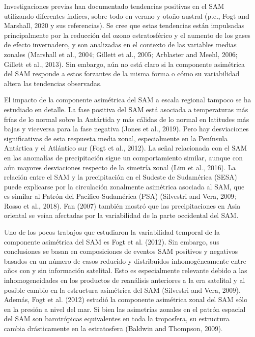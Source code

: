 \documentclass[12pt,oneside]{reedthesis}
\begin{document}
Investigaciones previas han documentado tendencias positivas en el SAM utilizando diferentes índices, sobre todo en verano y otoño austral (p.e., Fogt and Marshall, 2020 y sus referencias).
Se cree que estas tendencias están impulsadas principalmente por la reducción del ozono estratosférico y el aumento de los gases de efecto invernadero, y son analizadas en el contexto de las variables medias zonales (Marshall et al., 2004; Gillett et al., 2005; Arblaster and Meehl, 2006; Gillett et al., 2013).
Sin embargo, aún no está claro si la componente asimétrica del SAM responde a estos forzantes de la misma forma o cómo su variabilidad altera las tendencias observadas.

El impacto de la componente asimétrica del SAM a escala regional tampoco se ha estudiado en detalle.
La fase positiva del SAM está asociada a temperaturas más frías de lo normal sobre la Antártida y más cálidas de lo normal en latitudes más bajas y viceversa para la fase negativa (Jones et al., 2019).
Pero hay desviaciones significativas de esta respuesta media zonal, especialmente en la Península Antártica y el Atlántico sur (Fogt et al., 2012).
La señal relacionada con el SAM en las anomalías de precipitación sigue un comportamiento similar, aunque con aún mayores desviaciones respecto de la simetría zonal (Lim et al., 2016).
La relación entre el SAM y la precipitación en el Sudeste de Sudamérica (SESA) puede explicarse por la circulación zonalmente asimétrica asociada al SAM, que es similar al Patrón del Pacífico-Sudamérica (PSA) (Silvestri and Vera, 2009; Rosso et al., 2018).
Fan (2007) también mostró que las precipitaciones en Asia oriental se veían afectadas por la variabilidad de la parte occidental del SAM.

Uno de los pocos trabajos que estudiaron la variabilidad temporal de la componente asimétrica del SAM es Fogt et al. (2012).
Sin embargo, sus conclusiones se basan en composiciones de eventos SAM positivos y negativos basados en un número de casos reducido y distribuidos inhomogéneamente entre años con y sin información satelital.
Esto es especialmente relevante debido a las inhomogeneidades en los productos de reanálisis anteriores a la era satelital y al posible cambio en la estructura asimétrica del SAM (Silvestri and Vera, 2009).
Además, Fogt et al. (2012) estudió la componente asimétrica zonal del SAM sólo en la presión a nivel del mar.
Si bien las asimetrías zonales en el patrón espacial del SAM son barotrópicas equivalentes en toda la troposfera, su estructura cambia drásticamente en la estratosfera (Baldwin and Thompson, 2009).
\end{document}
